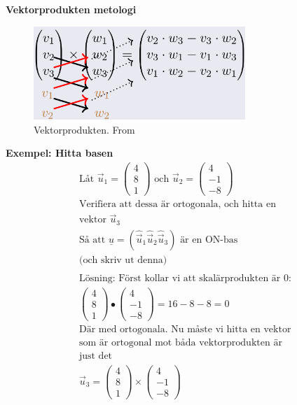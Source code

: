 \begin{multicols}{2}
\textbf{Vektorprodukten metologi}
\begin{figure}[H]
    \centering
    \includegraphics[width=8cm]{image/vektorprodukt.png} 
    \caption{Vektorprodukten. From \cite{}}
\end{figure}

\textbf{Exempel: Hitta basen}
\begin{align*} 
  &\text{Låt }
  \vec{u}_1 = \begin{pmatrix} 4 \\ 8 \\ 1 \end{pmatrix} \text{ och }
  \vec{u}_2 = \begin{pmatrix} 4 \\ -1 \\ -8 \end{pmatrix} \\
  &\text{Verifiera att dessa är ortogonala, och hitta en} \\
  &\text{vektor } \vec{u}_3 \\
  &\text{Så att } \underline{u} = (\hat\vec{u}_1 \hat\vec{u}_2 \hat\vec{u}_3)
  \text{ är en ON-bas } \\
  &\text{(och skriv ut denna)} \\
  &\\
  &\text{Lösning: Först kollar vi att skalärprodukten är } 0: \\
  &\begin{pmatrix} 4 \\ 8 \\ 1 \end{pmatrix} \bullet \begin{pmatrix} 4 \\ -1 \\ -8 \end{pmatrix}
  = 16-8-8=0 \\
  &\text{Där med ortogonala. Nu måste vi hitta en vektor} \\
  &\text{som är ortogonal mot båda vektorprodukten är} \\
  &\text{just det} \\
  &\vec{u}_3 =
  \begin{pmatrix} 4 \\ 8 \\ 1 \end{pmatrix} \times \begin{pmatrix} 4 \\ -1 \\ -8 \end{pmatrix}

\end{align*}
\end{multicols}
